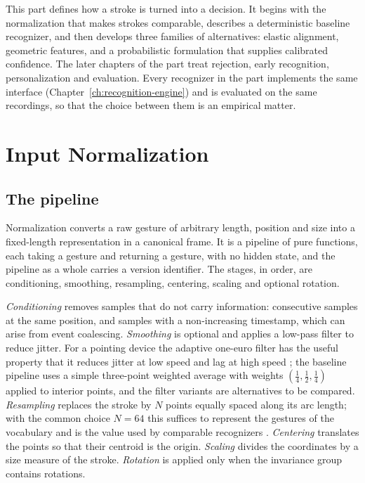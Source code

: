 This part defines how a stroke is turned into a decision. It begins with the normalization that makes strokes comparable, describes a deterministic baseline recognizer, and then develops three families of alternatives: elastic alignment, geometric features, and a probabilistic formulation that supplies calibrated confidence. The later chapters of the part treat rejection, early recognition, personalization and evaluation. Every recognizer in the part implements the same interface (Chapter~\ref{ch:recognition-engine}) and is evaluated on the same recordings, so that the choice between them is an empirical matter.

\chapter{Input Normalization}\label{ch:normalization}

\section{The pipeline}

Normalization converts a raw gesture of arbitrary length, position and size into a fixed-length representation in a canonical frame. It is a pipeline of pure functions, each taking a gesture and returning a gesture, with no hidden state, and the pipeline as a whole carries a version identifier. The stages, in order, are conditioning, smoothing, resampling, centering, scaling and optional rotation.

\emph{Conditioning} removes samples that do not carry information: consecutive samples at the same position, and samples with a non-increasing timestamp, which can arise from event coalescing. \emph{Smoothing} is optional and applies a low-pass filter to reduce jitter. For a pointing device the adaptive one-euro filter has the useful property that it reduces jitter at low speed and lag at high speed \cite{casiez2012}\evD{}; the baseline pipeline uses a simple three-point weighted average with weights $(\tfrac14,\tfrac12,\tfrac14)$ applied to interior points, and the filter variants are alternatives to be compared. \emph{Resampling} replaces the stroke by $N$ points equally spaced along its arc length; with the common choice $N=64$ this suffices to represent the gestures of the vocabulary and is the value used by comparable recognizers \cite{wobbrock2007}.\evD{} \emph{Centering} translates the points so that their centroid is the origin. \emph{Scaling} divides the coordinates by a size measure of the stroke. \emph{Rotation} is applied only when the invariance group contains rotations.

